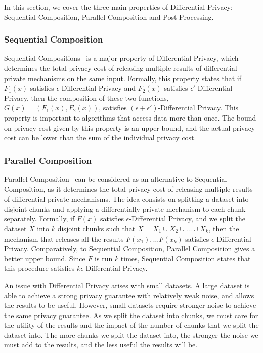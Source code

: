 In this section, we cover the three main properties of Differential Privacy: Sequential Composition, Parallel Composition and Post-Processing.

\subsubsection{Sequential Composition}\label{subsubsec:sequential_composition}

Sequential Compositions~\cite{DP_Book, AlgFoundationsDP} is a major property of Differential Privacy, which determines the total privacy cost of releasing multiple results of differential private mechanisms on the same input. Formally, this property states that if \(F_1(x)\) satisfies \(\epsilon\)-Differential Privacy and \(F_2(x)\) satisfies \(\epsilon'\)-Differential Privacy, then the composition of these two functions, \(G(x) = (F_1(x), F_2(x))\), satisfies \((\epsilon + \epsilon')\)-Differential Privacy. This property is important to algorithms that access data more than once. The bound on privacy cost given by this property is an upper bound, and the actual privacy cost can be lower than the sum of the individual privacy cost.

\subsubsection{Parallel Composition}\label{subsubsec:parallel_composition}

Parallel Composition~\cite{DP_Book, AlgFoundationsDP} can be considered as an alternative to Sequential Composition, as it determines the total privacy cost of releasing multiple results of differential private mechanisms. The idea consists on splitting a dataset into disjoint chunks and applying a differentially private mechanism to each chunk separately. Formally, if \(F(x)\) satisfies \(\epsilon\)-Differential Privacy, and we split the dataset \(X\) into \(k\) disjoint chunks such that \(X = X_1 \cup X_2 \cup \ldots \cup X_k\), then the mechanism that releases all the results \(F(x_1), \ldots F(x_k)\) satisfies \(\epsilon\)-Differential Privacy. Comparatively, to Sequential Composition, Parallel Composition gives a better upper bound. Since \(F\) is run \(k\) times, Sequential Composition states that this procedure satisfies \(k\epsilon\)-Differential Privacy.

An issue with Differential Privacy arises with small datasets. A large dataset is able to achieve a strong privacy guarantee with relatively weak noise, and allows the results to be useful. However, small datasets require stronger noise to achieve the same privacy guarantee.
As we split the dataset into chunks, we must care for the utility of the results and the impact of the number of chunks that we split the dataset into. The more chunks we split the dataset into, the stronger the noise we must add to the results, and the less useful the results will be.

